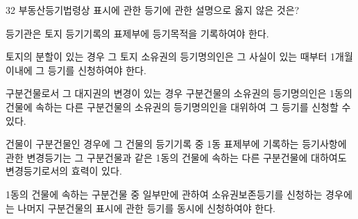 \begin{question}{32}
부동산등기법령상 표시에 관한 등기에 관한 설명으로 옳지 않은 것은?
\begin{choices}
  \item 등기관은 토지 등기기록의 표제부에 등기목적을 기록하여야 한다.
  \item 토지의 분할이 있는 경우 그 토지 소유권의 등기명의인은 그 사실이 있는 때부터 1개월 이내에 그 등기를 신청하여야 한다.
  \item 구분건물로서 그 대지권의 변경이 있는 경우 구분건물의 소유권의 등기명의인은 1동의 건물에 속하는 다른 구분건물의 소유권의 등기명의인을 대위하여 그 등기를 신청할 수 있다.
  \item 건물이 구분건물인 경우에 그 건물의 등기기록 중 1동 표제부에 기록하는 등기사항에 관한 변경등기는 그 구분건물과 같은 1동의 건물에 속하는 다른 구분건물에 대하여도 변경등기로서의 효력이 있다.
  \item 1동의 건물에 속하는 구분건물 중 일부만에 관하여 소유권보존등기를 신청하는 경우에는 나머지 구분건물의 표시에 관한 등기를 동시에 신청하여야 한다.
\end{choices}
\end{question}
